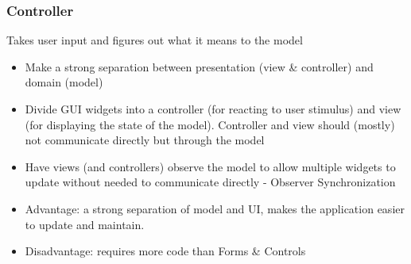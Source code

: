\documentclass[../SWD_disp.tex]{subfiles}
\begin{document}
\subsubsection*{Controller}
Takes user input and figures out what it means to the model 
\begin{itemize}
\item Make a strong separation between presentation (view \& controller) and domain (model)
\item Divide GUI widgets into a controller (for reacting to user stimulus) and view (for displaying the state of the model). Controller and view should (mostly) not communicate directly but through the model
\item Have views (and controllers) observe the model to allow multiple widgets to update without needed to communicate directly - Observer Synchronization
\item Advantage: a strong separation of model and UI, makes the application easier to update and maintain. 
\item Disadvantage: requires more code than Forms \& Controls 
\end{itemize}
\end{document}
